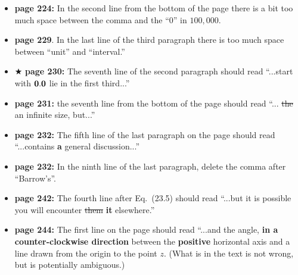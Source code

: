 \documentclass[12pt]{article}
\begin{document}
\begin{itemize}


  \item {\bf page 224:}  In the second line from the bottom of the
    page there is a bit too much space between the comma and the ``0''
    in $100,000$. 

  \item {\bf page 229}.  In the last line of the third paragraph there
    is too much space between ``unit'' and ``interval.''  %

  \item $\bigstar$ {\bf page 230:}  The seventh line of the second
    paragraph should read ``...start with ${\bf 0.0}$ lie in the first
    third...'' 

  \item {\bf page 231:}  the seventh line from the bottom of the page
    should read ``... \sout{the} an infinite size, but...''%

  \item {\bf page 232:} The fifth line of the last paragraph on the
    page should read ``...contains {\bf a} general discussion...''

  \item {\bf page 232:}  In the ninth line of the last paragraph,
    delete the comma after ``Barrow's''. %

  \item {\bf page 242:}  The fourth line after Eq.~(23.5) should read
    ``...but it is possible you will encounter \sout{them} {\bf it}
    elsewhere.'' 

  \item {\bf page 244:}  The first line on the page should read
    ``...and the angle, {\bf in a counter-clockwise direction} between
    the {\bf positive} horizontal axis and a line drawn from the
    origin to the point $z$.  (What is in the text is not wrong, but
    is potentially ambiguous.)


\end{itemize}
\end{document}
